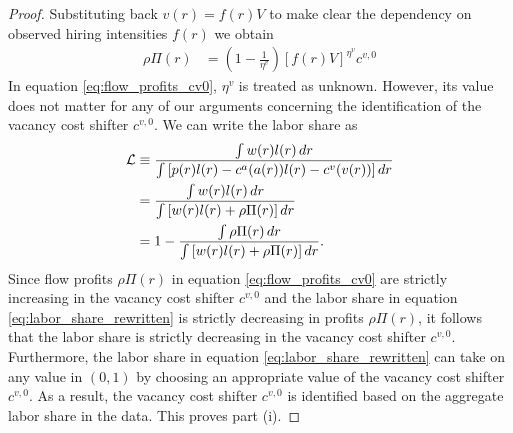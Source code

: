 \begin{proof}
    Substituting back $v(r) = f(r) V$ to make clear the dependency on observed hiring intensities $f(r)$ we obtain
    \begin{align}
       \rho \Pi(r) & = \left(1 - \frac{1}{\eta^{v}} \right) \left[f(r) V\right]^{\eta^{v}} c^{v,0} \label{eq:flow_profits_cv0}
    \end{align}
    In equation \eqref{eq:flow_profits_cv0}, $\eta^{v}$ is treated as unknown. However, its value does not matter for any of our arguments concerning the identification of the vacancy cost shifter $c^{v,0}$. We can write the labor share as
    \begin{align}
        \mathcal{L}  &\equiv \frac{ \int w(r) l(r) \mathop{}\!{d} r}{ \int \left[ p(r)l(r) - c^{a}(a(r))l(r) - c^{v}(v(r)) \right] \mathop{}\!{d} r } \\
        &= \frac{ \int w(r)l(r) \mathop{}\!{d} r }{ \int \left[ w(r)l(r) + \rho \Pi(r) \right] \mathop{}\!{d} r } \\
        &= 1 - \frac{ \int \rho \Pi(r) \mathop{}\!{d} r}{ \int \left[ w(r)l(r) + \rho \Pi(r) \right] \mathop{}\!{d} r }. \label{eq:labor_share_rewritten}
    \end{align}
    Since flow profits $\rho \Pi(r)$ in equation \eqref{eq:flow_profits_cv0} are strictly increasing in the vacancy cost shifter $c^{v,0}$ and the labor share in equation \eqref{eq:labor_share_rewritten} is strictly decreasing in profits $\rho \Pi(r)$, it follows that the labor share is strictly decreasing in the vacancy cost shifter $c^{v,0}$. Furthermore, the labor share in equation \eqref{eq:labor_share_rewritten} can take on any value in $(0, 1)$ by choosing an appropriate value of the vacancy cost shifter $c^{v,0}$. As a result, the vacancy cost shifter $c^{v,0}$ is identified based on the aggregate labor share in the data. This proves part (i).


\end{proof}
